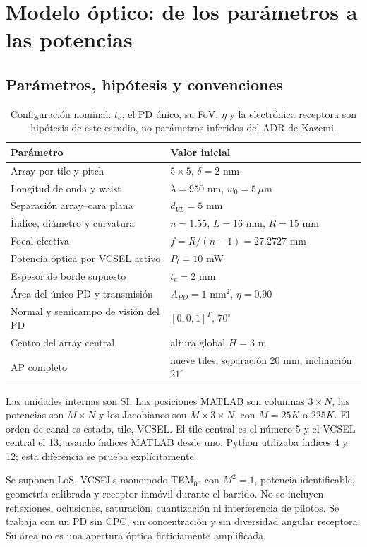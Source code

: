 \section{Modelo óptico: de los parámetros a las potencias}
\subsection{Parámetros, hipótesis y convenciones}
\begin{table}[H]\centering
\begin{tabular}{ll}\toprule
Parámetro & Valor inicial\\\midrule
Array por tile y pitch & $5\times5$, $\delta=2$ mm\\
Longitud de onda y waist & $\lambda=950$ nm, $w_0=5\,\mu$m\\
Separación array--cara plana & $d_{VL}=5$ mm\\
Índice, diámetro y curvatura & $n=1.55$, $L=16$ mm, $R=15$ mm\\
Focal efectiva & $f=R/(n-1)=27.2727$ mm\\
Potencia óptica por VCSEL activo & $P_t=10$ mW\\
Espesor de borde supuesto & $t_e=2$ mm\\
Área del único PD y transmisión & $A_{PD}=1$ mm$^2$, $\eta=0.90$\\
Normal y semicampo de visión del PD & $[0,0,1]^T$, $70^\circ$\\
Centro del array central & altura global $H=3$ m\\
AP completo & nueve tiles, separación 20 mm, inclinación $21^\circ$\\\bottomrule
\end{tabular}
\caption{Configuración nominal. $t_e$, el PD único, su FoV, $\eta$ y la electrónica receptora son hipótesis de este estudio, no parámetros inferidos del ADR de Kazemi.}
\end{table}

Las unidades internas son SI. Las posiciones MATLAB son columnas $3\times N$, las potencias son $M\times N$ y los Jacobianos son $M\times3\times N$, con $M=25K$ o $225K$. El orden de canal es estado, tile, VCSEL. El tile central es el número 5 y el VCSEL central el 13, usando índices MATLAB desde uno. Python utilizaba índices 4 y 12; esta diferencia se prueba explícitamente.

Se suponen LoS, VCSELs monomodo TEM$_{00}$ con $M^2=1$, potencia identificable, geometría calibrada y receptor inmóvil durante el barrido. No se incluyen reflexiones, oclusiones, saturación, cuantización ni interferencia de pilotos. Se trabaja con un PD sin CPC, sin concentración y sin diversidad angular receptora. Su área no es una apertura óptica ficticiamente amplificada.

